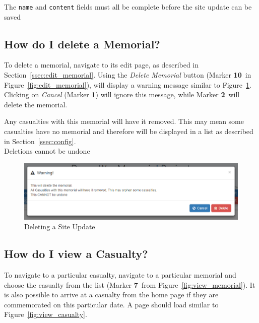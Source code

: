 \documentclass[12pt]{article}
\newcommand{\marker}[1]{Marker \color{red}\textbf{#1}\color{black}}
\begin{document}
\begin{infoBox}
The \texttt{name} and \texttt{content} fields must all be complete before the site update can be saved
\end{infoBox}

\FloatBarrier
\subsection{How do I delete a Memorial?}\label{ssec:delete_memorial}
To delete a memorial, navigate to its edit page, as described in Section~\ref{ssec:edit_memorial}. Using the \textit{Delete Memorial} button (\marker{10}\ in Figure~\ref{fig:edit_memorial}), will display a warning message similar to Figure~\ref{fig:delete_memorial}. Clicking on \textit{Cancel} (\marker{1}) will ignore this message, while \marker{2}\ will delete the memorial.

\begin{warningBox}
Any casualties with this memorial will have it removed. This may mean some casualties have no memorial and therefore will be displayed in a list as described in Section~\ref{ssec:config}.\\
Deletions cannot be undone
\end{warningBox}

\begin{figure}[h]
  \centering
 \includegraphics[width=.9\textwidth]{pics/delete_memorial.png}
	\caption{Deleting a Site Update}\label{fig:delete_memorial}
\end{figure}

\newpage
\FloatBarrier
\subsection{How do I view a Casualty?}\label{ssec:view_casualty}
To navigate to a particular casualty, navigate to a particular memorial and choose the casualty from the list (\marker{7}\ from Figure~\ref{fig:view_memorial}). It is also possible to arrive at a casualty from the home page if they are commemorated on this particular date. A page should load similar to Figure~\ref{fig:view_casualty}.
\end{document}
